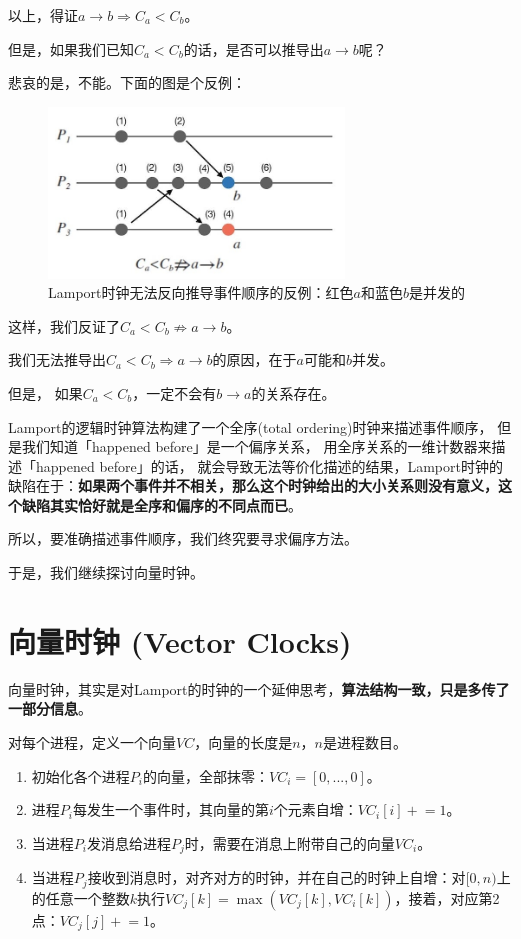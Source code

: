 \documentclass[cn,11pt,chinese]{elegantbook}
\begin{document}
以上，得证$a \rightarrow b \Rightarrow C_a < C_b$。

但是，如果我们已知$C_a < C_b$的话，是否可以推导出$a \rightarrow b$呢？

悲哀的是，不能。下面的图是个反例：

\begin{figure}
    \centering
    \includegraphics[width=0.7\textwidth]{images/appendix-a-12.jpeg}
    \caption{Lamport时钟无法反向推导事件顺序的反例：红色$a$和蓝色$b$是并发的}
\end{figure}

这样，我们反证了$C_a < C_b \nRightarrow a \rightarrow b$。

我们无法推导出$C_a < C_b \Rightarrow a \rightarrow b$的原因，在于$a$可能和$b$并发。

但是， 如果$C_a < C_b$，一定不会有$b \rightarrow a$的关系存在。

Lamport的逻辑时钟算法构建了一个全序(total ordering)时钟来描述事件顺序， 但是我们知道「happened before」是一个偏序关系， 用全序关系的一维计数器来描述「happened before」的话， 就会导致无法等价化描述的结果，Lamport时钟的缺陷在于：\textbf{如果两个事件并不相关，那么这个时钟给出的大小关系则没有意义，这个缺陷其实恰好就是全序和偏序的不同点而已}。

所以，要准确描述事件顺序，我们终究要寻求偏序方法。

于是，我们继续探讨向量时钟。

\section{向量时钟 (Vector Clocks)}

向量时钟，其实是对Lamport的时钟的一个延伸思考，\textbf{算法结构一致，只是多传了一部分信息}。

对每个进程，定义一个向量$VC$，向量的长度是$n$，$n$是进程数目。

\begin{enumerate}
    \item 初始化各个进程$P_i$的向量，全部抹零：$VC_i = [0,...,0]$。
    \item 进程$P_i$每发生一个事件时，其向量的第$i$个元素自增：$VC_i[i] \mathrel{+}= 1$。
    \item 当进程$P_i$发消息给进程$P_j$时，需要在消息上附带自己的向量$VC_i$。
    \item 当进程$P_j$接收到消息时，对齐对方的时钟，并在自己的时钟上自增：对$[0,n)$上的任意一个整数$k$执行$VC_j[k] = \max (VC_j[k],VC_i[k])$，接着，对应第2点：$VC_j[j] \mathrel{+}= 1$。
\end{enumerate}
\end{document}
